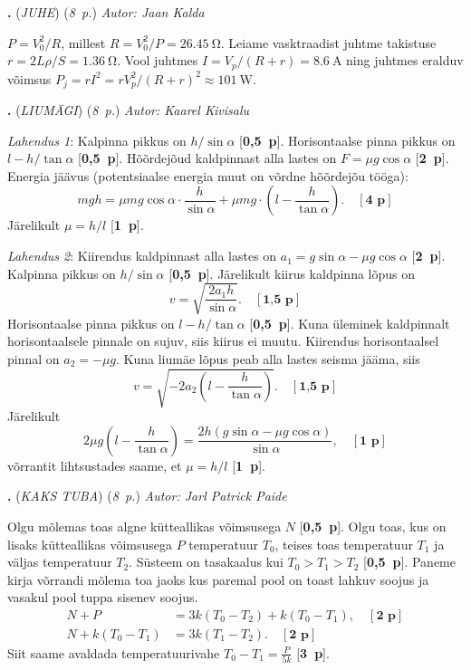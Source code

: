 \documentclass[11pt,a5paper]{article}
\newcommand{\numb}[1]{\vspace{5pt}\textbf{\large #1}}
\newcommand{\nimi}[1]{(\textsl{\small #1})}
\newcommand{\punktid}[1]{(\emph{#1~p.})}
\newcommand{\p}[1]{[\textbf{#1~p}]}
\newcounter{ylesanne}
\newcommand{\yl}[1]{\addtocounter{ylesanne}{1}\numb{\theylesanne.} \nimi{#1} \newblock{}}
\newcommand{\autor}[1]{\emph{Autor: #1}}%
\begin{document}
\newpage
\yl{JUHE}
\punktid{8} \autor{Jaan Kalda}

$P=V_0^2/R$, millest $R=V_0^2/P=\qty{26.45}{\ohm}$. Leiame vasktraadist juhtme takistuse $r=2L\rho/S=\qty{1.36}{\ohm}$. Vool juhtmes $I=V_p/(R+r)=\qty{8.6}{\A}$ ning juhtmes eralduv võimsus $P_j=rI^2=rV_p^2/(R+r)^2\approx\qty{101}{\W}$.

\newpage
\yl{LIUMÄGI}
\punktid{8} \autor{Kaarel Kivisalu}

\emph{Lahendus 1}:
Kalpinna pikkus on $h/\sin \alpha$ \p{0,5}. Horisontaalse pinna pikkus on $l-h/\tan \alpha$ \p{0,5}.
Hõõrdejõud kaldpinnast alla lastes on $F=\mu g \cos \alpha$ \p2. Energia jäävus (potentsiaalse energia muut on võrdne hõõrdejõu tööga):
\begin{equation*}
mgh = \mu mg \cos \alpha \cdot \frac{h}{\sin \alpha} + \mu mg \cdot \left(l- \frac{h}{\tan \alpha}\right). \quad \p4
\end{equation*}
Järelikult $\mu=h/l$ \p1.

\emph{Lahendus 2}:
Kiirendus kaldpinnast alla lastes on $a_1=g \sin \alpha - \mu g \cos \alpha$ \p2. Kalpinna pikkus on $h/\sin \alpha$ \p{0,5}. Järelikult kiirus kaldpinna lõpus on
\begin{equation*}
  v=\sqrt{\frac{2a_1h}{\sin \alpha}}. \quad \p{1,5}
\end{equation*}
Horisontaalse pinna pikkus on $l-h/\tan \alpha$ \p{0,5}. Kuna üleminek kaldpinnalt horisontaalsele pinnale on sujuv, siis kiirus ei muutu. Kiirendus horisontaalsel pinnal on $a_2= - \mu g $. Kuna liumäe lõpus peab alla lastes seisma jääma, siis
\begin{equation*}
  v=\sqrt{-2a_2\left(l-\frac{h}{\tan \alpha}\right)}.\quad \p{1,5}
\end{equation*}
Järelikult
\begin{equation*}
  2\mu g\left(l-\frac{h}{\tan \alpha}\right)=\frac{2h(g\sin \alpha - \mu g \cos \alpha)}{\sin \alpha}, \quad \p1
\end{equation*}
võrrantit lihtsustades saame, et $\mu=h/l$ \p1.

\yl{KAKS TUBA}
\punktid{8} \autor{Jarl Patrick Paide}

Olgu mõlemas toas algne kütteallikas võimsusega $N$ \p{0,5}. Olgu toas, kus on lisaks kütteallikas võimsusega $P$ temperatuur $T_0$, teises toas temperatuur $T_1$ ja väljas temperatuur $T_2$. Süsteem on tasakaalus kui $T_0 > T_1 > T_2$ \p{0,5}. Paneme kirja võrrandi mõlema toa jaoks kus paremal pool on toast lahkuv soojus ja vasakul pool tuppa sisenev soojus.
\begin{align*}
  N+P&=3k(T_0 - T_2)+k(T_0-T_1), \quad \p2\\
  N+k(T_0-T_1)&=3k(T_1 - T_2). \quad \p2
\end{align*}
Siit saame avaldada temperatuurivahe $T_0-T_1=\frac{P}{5k}$ \p3.
\end{document}
